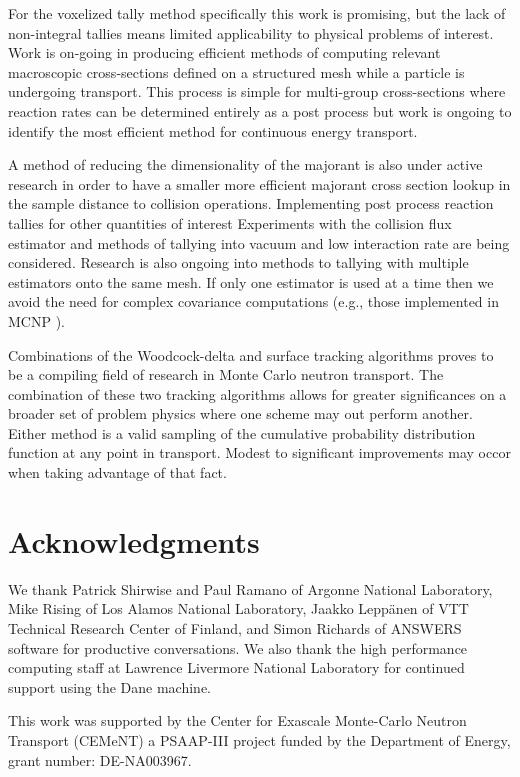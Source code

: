 For the voxelized tally method specifically this work is promising, but the lack of non-integral tallies means limited applicability to physical problems of interest.
Work is on-going in producing efficient methods of computing relevant macroscopic cross-sections defined on a structured mesh while a particle is undergoing transport.
This process is simple for multi-group cross-sections where reaction rates can be determined entirely as a post process but work is ongoing to identify the most efficient method for continuous energy transport.

A method of reducing the dimensionality of the majorant is also under active research in order to have a smaller more efficient majorant cross section lookup in the sample distance to collision operations.
Implementing post process reaction tallies for other quantities of interest
Experiments with the collision flux estimator and methods of tallying into vacuum and low interaction rate are being considered.
Research is also ongoing into methods to tallying with multiple estimators onto the same mesh.
If only one estimator is used at a time then we avoid the need for complex covariance computations (e.g., those implemented in MCNP \cite{urbatsch_estimation_1995} \cite{MCNP_RisingArmstrongEtAl}).

Combinations of the Woodcock-delta and surface tracking algorithms proves to be a compiling field of research in Monte Carlo neutron transport.
The combination of these two tracking algorithms allows for greater significances on a broader set of problem physics where one scheme may out perform another.
Either method is a valid sampling of the cumulative probability distribution function at any point in transport.
Modest to significant improvements may occor when taking advantage of that fact.


\section*{Acknowledgments}
We thank Patrick Shirwise and Paul Ramano of Argonne National Laboratory, Mike Rising of Los Alamos National Laboratory, Jaakko Leppänen of VTT Technical Research Center of Finland, and Simon Richards of ANSWERS software for productive conversations.
We also thank the high performance computing staff at Lawrence Livermore National Laboratory for continued support using the Dane machine. 

This work was supported by the Center for Exascale Monte-Carlo Neutron Transport (CEMeNT) a PSAAP-III project funded by the Department of Energy, grant number: DE-NA003967.

